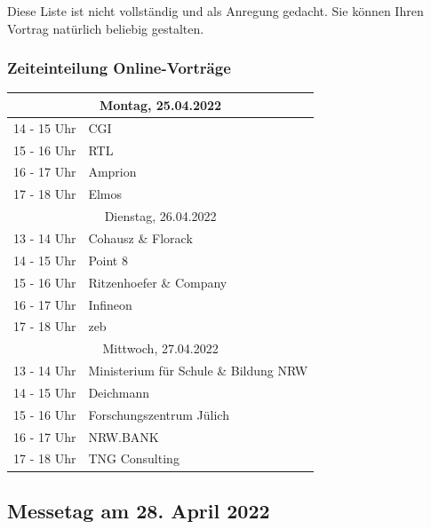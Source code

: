 \documentclass[
  paper=a4,
  fontsize=12pt,
  DIV=16,
  headheight=30pt,
  footheight=45pt,
  headinclude,
  parskip=half,
]{scrartcl}
\begin{document}
Diese Liste ist nicht vollständig und als Anregung gedacht.
Sie können Ihren Vortrag natürlich beliebig gestalten.

\subsubsection*{Zeiteinteilung Online-Vorträge}

\begin{table}[htbp]
    \centering
\begin{tabular}{|c|l|}
    \hline
    \multicolumn{2}{|c|}{Montag, 25.04.2022} \\
    \hline
    \rowcolor{gray!30} 14 - 15 Uhr & CGI \\
    \rowcolor{gray!10} 15 ­- 16 Uhr & RTL \\
    \rowcolor{gray!30} 16 - 17 Uhr & Amprion\\
    \rowcolor{gray!10} 17 ­- 18 Uhr & Elmos \\
    \hline
    \multicolumn{2}{|c|}{Dienstag, 26.04.2022} \\
    \hline
    \rowcolor{gray!10} 13 - 14 Uhr & Cohausz \& Florack \\
    \rowcolor{gray!30} 14 - 15 Uhr & Point 8 \\
    \rowcolor{gray!10} 15 ­- 16 Uhr & Ritzenhoefer \& Company \\
    \rowcolor{gray!30} 16 - 17 Uhr & Infineon \\
    \rowcolor{gray!10} 17 ­- 18 Uhr & zeb \\
    \hline
    \multicolumn{2}{|c|}{Mittwoch, 27.04.2022} \\
    \hline
    \rowcolor{gray!10} 13 - 14 Uhr & Ministerium für Schule \& Bildung NRW \\
    \rowcolor{gray!30} 14 - 15 Uhr & Deichmann \\
    \rowcolor{gray!10} 15 ­- 16 Uhr & Forschungszentrum Jülich \\
    \rowcolor{gray!30} 16 - 17 Uhr & NRW.BANK\\
    \rowcolor{gray!10} 17 ­- 18 Uhr & TNG Consulting \\
    \hline
    \end{tabular}

\end{table}


\subsection*{Messetag am 28. April 2022}
\end{document}
